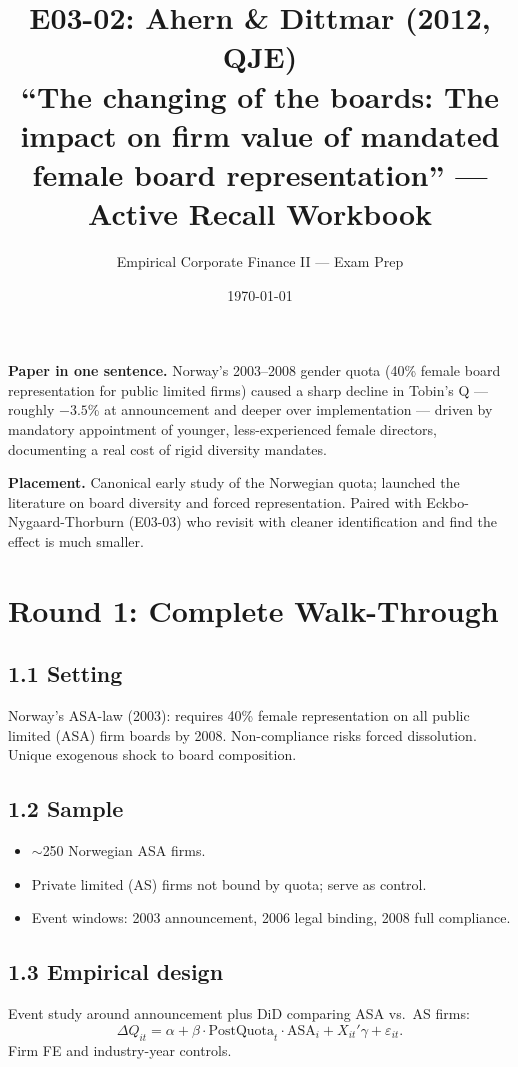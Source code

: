 \documentclass[11pt]{article}
\title{E03-02: Ahern \& Dittmar (2012, QJE) \\
\large ``The changing of the boards: The impact on firm value of mandated female board representation'' --- Active Recall Workbook}
\author{Empirical Corporate Finance II --- Exam Prep}
\date{\today}
\begin{document}
\maketitle

\begin{keybox}
\textbf{Paper in one sentence.} Norway's 2003--2008 gender quota (40\% female board representation for public limited firms) caused a sharp decline in Tobin's Q --- roughly $-3.5$\% at announcement and deeper over implementation --- driven by mandatory appointment of younger, less-experienced female directors, documenting a real cost of rigid diversity mandates.

\textbf{Placement.} Canonical early study of the Norwegian quota; launched the literature on board diversity and forced representation. Paired with Eckbo-Nygaard-Thorburn (E03-03) who revisit with cleaner identification and find the effect is much smaller.
\end{keybox}

\section*{Round 1: Complete Walk-Through}

\subsection*{1.1 Setting}
Norway's ASA-law (2003): requires 40\% female representation on all public limited (ASA) firm boards by 2008. Non-compliance risks forced dissolution. Unique exogenous shock to board composition.

\subsection*{1.2 Sample}
\begin{itemize}
\item $\sim$250 Norwegian ASA firms.
\item Private limited (AS) firms not bound by quota; serve as control.
\item Event windows: 2003 announcement, 2006 legal binding, 2008 full compliance.
\end{itemize}

\subsection*{1.3 Empirical design}
Event study around announcement plus DiD comparing ASA vs.\ AS firms:
\[
\Delta Q_{it} = \alpha + \beta\cdot\text{PostQuota}_{t}\cdot\text{ASA}_{i}+X_{it}'\gamma+\varepsilon_{it}.
\]
Firm FE and industry-year controls.
\end{document}
